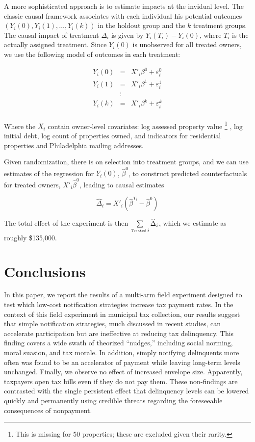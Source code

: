\documentclass[12pt,titlepage]{article}
\begin{document}
A more sophisticated approach is to estimate impacts at the invidual 
level. The classic causal framework associates with each individual
his potential outcomes $(Y_i(0), Y_i(1), \ldots, Y_i(k))$ in the
holdout group and the $k$ treatment groups. The causal impact of
treatment $\Delta_i$ is given by $Y_i(T_i) - Y_i(0)$, where $T_i$
is the actually assigned treatment. Since $Y_i(0)$ is unobserved
for all treated owners, we use the following model of outcomes
in each treatment:

\begin{eqnarray*}
Y_i(0) & = & X'_i \beta^0 + \varepsilon_i^0\\
Y_i(1) & = & X'_i \beta^1 + \varepsilon_i^1\\
    & \vdots & \\
Y_i(k) & = & X'_i \beta^k + \varepsilon_i^k\\
\end{eqnarray*}

Where the $X_i$ contain owner-level covariates: log assessed
property value
\footnote{
	This is missing for 50 properties; these are excluded
	given their rarity.
}
, log initial debt, log count of properties owned,
and indicators for residential properties and Philadelphia 
mailing addresses. 

Given randomization, there is on selection into treatment groups,
and we can use estimates of the regression for $Y_i(0)$,
$\hat{\beta}^0$, to construct predicted counterfactuals for 
treated owners, $X'_i \hat{\beta}^0$, leading to causal estimates

\[
\widehat{\Delta}_i = X'_i (\hat{\beta}^{T_i} - \hat{\beta}^0)
\]

The total effect of the experiment is then
$\sum\limits_{\mbox{\fontsize{5}{5}\selectfont Treated} \, i} \widehat{\Delta}_i$, which we 
estimate as roughly \$135,000.

\section{Conclusions}

In this paper, we report the results of a multi-arm field experiment 
designed to test which low-cost notification strategies increase tax 
payment rates. In the context of this field experiment in municipal 
tax collection, our results suggest that simple notification strategies, 
much discussed in recent studies, can accelerate participation but are 
ineffective at reducing tax delinquency. This finding covers a 
wide swath of theorized “nudges,” including social norming, moral suasion, 
and tax morale. In addition, simply notifying delinquents more often was 
found to be an accelerator of payment while leaving long-term levels 
unchanged. Finally, we observe no effect of increased envelope size. 
Apparently, taxpayers open tax bills even if they do not pay them.
These non-findings are contrasted with the single persistent effect 
that delinquency levels can be lowered quickly and permanently using 
credible threats regarding the foreseeable consequences of nonpayment. 
\end{document}
